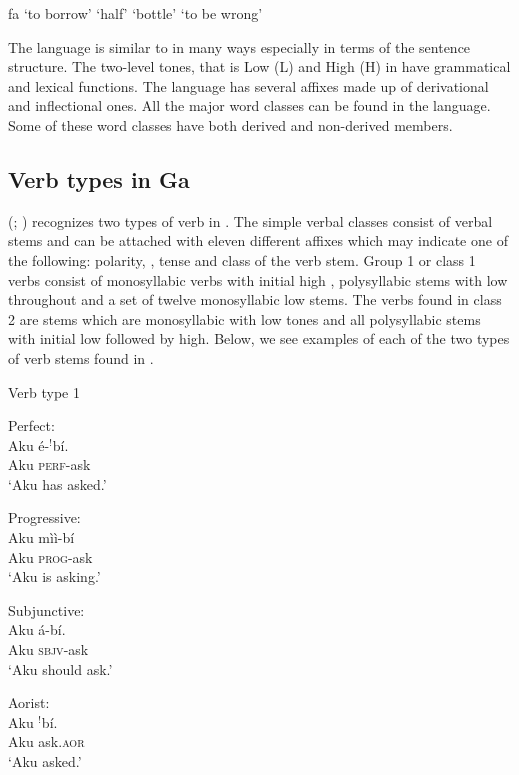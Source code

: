 \documentclass[output=paper,newtxmath,modfonts,nonflat,hidelinks]{langsci/langscibook}
\begin{document}
\ea \label{ex:ollennu:1} 
\ea fa  `to borrow'  
  `half' 
   `bottle' 
   `to be wrong'
\z
\z

The language is similar to  in many ways especially in terms of the sentence structure. The two-level tones, that is Low (L) and High (H) in  have grammatical and lexical functions. The language has several affixes made up of derivational and inflectional ones. All the major word classes can be found in the language. Some of these word classes have both derived and non-derived members.

\subsection{\label{sec:ollennu:1.2} Verb types in Ga}

\citeauthor{Dakubu1970}  (\citeyear{Dakubu1970}; \citeyear{Dakubu2003}) recognizes two types of verb in . The simple verbal classes consist of verbal stems and can be attached with eleven different affixes which may indicate one of the following: polarity, , tense and class of the verb stem. Group 1 or class 1 verbs consist of monosyllabic verbs with initial high , polysyllabic stems with low  throughout and a set of twelve monosyllabic low  stems. The verbs found in class 2 are stems which are monosyllabic with low tones and all polysyllabic stems with initial low  followed by high. Below, we see examples of each of the two types of verb stems found in .


Verb type 1



\ea \label{ex:ollennu:2} Perfect:\\
\ea
\gll Aku é-$^{!}$bí. \\
	Aku \textsc{perf}-ask \\
\glt `Aku has asked.'

\ex Progressive:\\
\gll Aku mìì-bí\\
Aku \textsc{prog}-ask\\
\glt `Aku is asking.'

\ex Subjunctive:\\
\gll Aku á-bí.\\
Aku \textsc{sbjv}-ask\\
\glt `Aku should ask.'
\z 
\z

\ea Aorist:\\
\ea
\gll Aku $^{!}$bí.\\
Aku ask.\textsc{aor}\\
\glt `Aku asked.'
\end{document}
